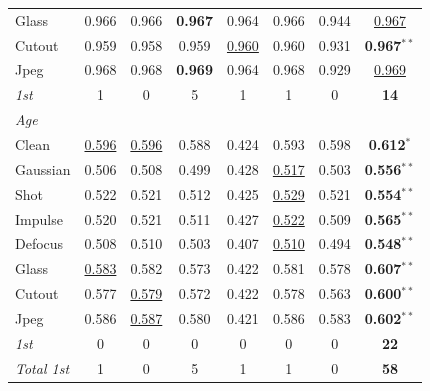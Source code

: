 \begin{table}[htbp]
\begin{tabular}{lccccccc}
Glass      & 0.966 & 0.966 & \textbf{0.967} & 0.964 & 0.966 & 0.944 & \underline{0.967} \\
Cutout     & 0.959 & 0.958 & 0.959 & \underline{0.960} & 0.960 & 0.931 & \textbf{0.967}$^{**}$ \\
Jpeg       & 0.968 & 0.968 & \textbf{0.969} & 0.964 & 0.968 & 0.929 & \underline{0.969} \\
\textit{1st} & 1 & 0 & 5 & 1 & 1 & 0 & \textbf{14} \\
\midrule
\multicolumn{8}{l}{\textit{Age}} \\
Clean      & \underline{0.596} & \underline{0.596} & 0.588 & 0.424 & 0.593 & 0.598 & \textbf{0.612}$^{*}$ \\
Gaussian   & 0.506 & 0.508 & 0.499 & 0.428 & \underline{0.517} & 0.503 & \textbf{0.556}$^{**}$ \\
Shot       & 0.522 & 0.521 & 0.512 & 0.425 & \underline{0.529} & 0.521 & \textbf{0.554}$^{**}$ \\
Impulse    & 0.520 & 0.521 & 0.511 & 0.427 & \underline{0.522} & 0.509 & \textbf{0.565}$^{**}$ \\
Defocus    & 0.508 & 0.510 & 0.503 & 0.407 & \underline{0.510} & 0.494 & \textbf{0.548}$^{**}$ \\
Glass      & \underline{0.583} & 0.582 & 0.573 & 0.422 & 0.581 & 0.578 & \textbf{0.607}$^{**}$ \\
Cutout     & 0.577 & \underline{0.579} & 0.572 & 0.422 & 0.578 & 0.563 & \textbf{0.600}$^{**}$ \\
Jpeg       & 0.586 & \underline{0.587} & 0.580 & 0.421 & 0.586 & 0.583 & \textbf{0.602}$^{**}$ \\
\textit{1st} & 0 & 0 & 0 & 0 & 0 & 0 & \textbf{22} \\
\textit{Total 1st} & 1 & 0 & 5 & 1 & 1 & 0 & \textbf{58} \\
\bottomrule
\end{tabular}
\end{table}



